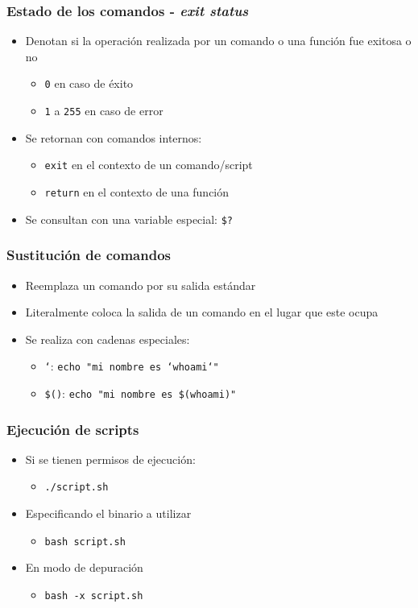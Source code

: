 \begin{frame}
  \frametitle{Estado de los comandos - \textit{exit status}}
  \begin{itemize}
    \item Denotan si la operación realizada por un comando o una función
      fue exitosa o no
      \begin{itemize}
        \item \texttt{0} en caso de éxito
        \item \texttt{1} a \texttt{255} en caso de error
      \end{itemize}
    \item Se retornan con comandos internos:
    \begin{itemize}
      \item \texttt{exit} en el contexto de un comando/script
      \item \texttt{return} en el contexto de una función
    \end{itemize}
    \item Se consultan con una variable especial: \texttt{\$?}
  \end{itemize}
\end{frame}

\begin{frame}
  \frametitle{Sustitución de comandos}
  \begin{itemize}
    \item Reemplaza un comando por su salida estándar
    \item Literalmente coloca la salida de un comando en el lugar que
      este ocupa
    \item Se realiza con cadenas especiales:
    \begin{itemize}
      \item \texttt{`}: \texttt{echo \string"mi nombre es `whoami`\string"}
      \item \texttt{\$()}: \texttt{echo \string"mi nombre es \$(whoami)\string"}
    \end{itemize}
  \end{itemize}
\end{frame}

\begin{frame}
  \frametitle{Ejecución de scripts}
  \begin{itemize}
    \item Si se tienen permisos de ejecución:
    \begin{itemize}
      \item \texttt{./script.sh}
    \end{itemize}
    \item Especificando el binario a utilizar
    \begin{itemize}
      \item \texttt{bash script.sh}
    \end{itemize}
    \item En modo de depuración
    \begin{itemize}
      \item \texttt{bash -x script.sh}
    \end{itemize}
  \end{itemize}
\end{frame}

